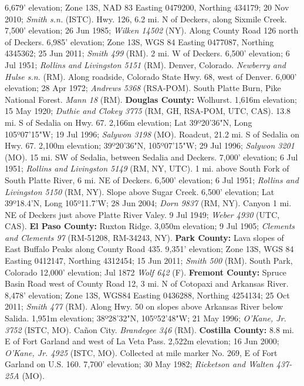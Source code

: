 6,679' elevation; Zone 13S, NAD 83 Easting 0479200, Northing 434179;
20 Nov 2010; \textit{Smith s.n.} (ISTC).
Hwy. 126, 6.2 mi. N of Deckers, along Sixmile Creek. 7,500' elevation;
26 Jun 1985; \textit{Wilken 14502} (NY).
Along County Road 126 north of Deckers. 6,985' elevation; Zone 13S,
WGS 84 Easting 0477087, Northing 4345362; 25 Jun 2011; \textit{Smith 499} (RM).
2 mi. W of Deckers. 6,500' elevation; 6 Jul 1951;
\textit{Rollins and Livingston 5151} (RM).
Denver, Colorado. \textit{Newberry and Hulse s.n.} (RM).
Along roadside, Colorado State Hwy. 68, west of Denver. 6,000' elevation;
28 Apr 1972; \textit{Andrews 5368} (RSA-POM).
South Platte Burn, Pike National Forest. \textit{Mann 18} (RM).
  \textbf{Douglas County:}
Wolhurst. 1,616m elevation; 15 May 1920;
\textit{Duthie and Clokey 3775} (RM, GH, RSA-POM, UTC, CAS).
13.8 mi. S of Sedalia on Hwy. 67. 2,166m elevation;
Lat 39º20'36"N, Long 105º07'15"W; 19 Jul 1996; \textit{Salywon 3198} (MO).
Roadcut, 21.2 mi. S of Sedalia on Hwy. 67. 2,100m elevation;
39º20'36"N, 105º07'15"W; 29 Jul 1996; \textit{Salywon 3201} (MO).
15 mi. SW of Sedalia, between Sedalia and Deckers. 7,000' elevation;
6 Jul 1951; \textit{Rollins and Livingston 5149} (RM, NY, UTC).
1 mi. above South Fork of South Platte River, 6 mi. NE of Deckers.
6,500' elevation; 6 Jul 1951; \textit{Rollins and Livingston 5150} (RM, NY).
Slope above Sugar Creek. 6,500' elevation; Lat 39º18.4'N, Long 105º11.7'W;
28 Jun 2004; \textit{Dorn 9837} (RM, NY).
Canyon 1 mi. NE of Deckers just above Platte River Valey. 9 Jul 1949;
\textit{Weber 4930} (UTC, CAS).
  \textbf{El Paso County:}
Ruxton Ridge. 3,050m elevation; 9 Jul 1905;
\textit{Clements and Clements 97} (RM-51208, RM-34243, NY).
  \textbf{Park County:}
Lava slopes of East Buffalo Peaks along County Road 435. 9,351' elevation;
Zone 13S, WGS 84 Easting 0412147, Northing 4312454; 15 Jun 2011;
\textit{Smith 500} (RM).
South Park, Colorado 12,000' elevation; Jul 1872 \textit{Wolf 642} (F).
  \textbf{Fremont County:}
Spruce Basin Road west of County Road 12, 3 mi. N of Cotopaxi and Arkansas
River. 8,478' elevation; Zone 13S, WGS84 Easting 0436288, Northing 4254134;
25 Oct 2011; \textit{Smith 477} (RM).
Along Hwy. 50 on slopes above Arkansas River below Salida. 1,951m elevation;
38º28'32"N, 105º52'48"W; 21 May 1996; \textit{O'Kane, Jr. 3752} (ISTC, MO).
Cañon City. \textit{Brandegee 346} (RM).  
  \textbf{Costilla County:}
8.8 mi. E of Fort Garland and west of La Veta Pass. 2,522m elevation;
16 Jun 2000; \textit{O'Kane, Jr. 4925} (ISTC, MO).
Collected at mile marker No. 269, E of Fort Garland on U.S. 160.
7,700' elevation; 30 May 1982; \textit{Ricketson and Walten 437-25A} (MO).

